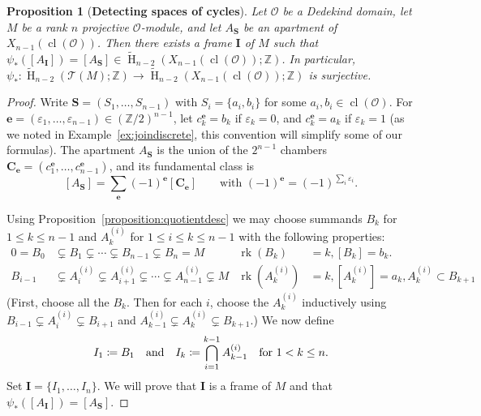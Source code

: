\documentclass[11 pt]{article}
\theoremstyle{plain}
\newtheorem{proposition}[theorem]{Proposition}
\theoremstyle{definition}
\numberwithin{equation}{section}
\newcommand\Z{\ensuremath{\mathbb{Z}}}
\DeclareMathOperator{\HH}{H}
\renewcommand{\epsilon}{\varepsilon}
\renewcommand{\O}{\mathcal{O}}
\DeclareMathOperator{\class}{cl}
\newcommand\Tits{\ensuremath{\mathcal{T}}}
\newcommand\II{\mathbf{I}}
\newcommand\bS{\mathbf{S}}
\newcommand\coloneq{\mathrel{\mathop:}\mkern-1.2mu=}
\newcommand\e{\mathbf{e}}
\newcommand\CC{\mathbf{C}}
\DeclareMathOperator{\Rank}{rk}
\begin{document}
\begin{proposition}[{\bf Detecting spaces of cycles}]
\label{prop:foldedapartment}
Let $\O$ be a Dedekind domain, let $M$ be a rank $n$ projective $\O$-module, and
let $A_{\bS}$ be an apartment of $X_{n-1}(\class(\O))$.  Then there exists a frame
$\II$ of $M$ such that
$\psi_{\ast}([A_\II])=[A_{\bS}] \in \widetilde{\HH}_{n-2}(X_{n-1}(\class(\O));\Z)$.
In particular, 
$\psi_\ast\colon \widetilde{\HH}_{n-2}(\Tits(M);\Z)\to \widetilde{\HH}_{n-2}(X_{n-1}(\class(\O));\Z)$ is surjective.
\end{proposition}
\begin{proof}
Write $\bS=(S_1,\ldots,S_{n-1})$ with 
$S_i=\{a_i,b_i\}$ for some $a_i,b_i\in\class(\O)$.  For $\e=(\epsilon_1,\ldots,\epsilon_{n-1})\in (\Z/2)^{n-1}$, 
let $c^\e_k=b_k$ if $\epsilon_k=0$, and $c^\e_k=a_k$ if $\epsilon_k=1$ (as
we noted in Example~\ref{ex:joindiscrete}, this convention will simplify some of our formulas).  The apartment 
$A_{\bS}$ is the union of the $2^{n-1}$ chambers $\CC_\e=(c^\e_1,\ldots,c^\e_{n-1})$, and its fundamental 
class is 
\[[A_{\bS}]=\sum_\e (-1)^{\e} [\CC_\e] \quad \quad \text{with $(-1)^{\e} = (-1)^{\sum_i \epsilon_i}$}.\]

Using Proposition~\ref{proposition:quotientdesc} we may choose summands $B_k$ for $1 \leq k \leq n-1$ and $A_k^{(i)}$ for $1 \leq i \leq k \leq n-1$ with the following properties:
\begin{align*}
0=B_0&\subsetneq B_1 \subsetneq \cdots \subsetneq B_{n-1} \subsetneq B_n=M& \Rank(B_k)&=k,[B_k]=b_k.\\
B_{i-1}& \subsetneq A_i^{(i)} \subsetneq A_{i+1}^{(i)} \subsetneq \cdots \subsetneq A_{n-1}^{(i)} \subsetneq M& \Rank(A_k^{(i)})& = k, [A_k^{(i)}] = a_k, A_k^{(i)} \subset B_{k+1}
\end{align*}
(First, choose all the $B_k$. Then for each $i$, choose the $A_k^{(i)}$ inductively using $B_{i-1}\subsetneq A_i^{(i)}\subsetneq B_{i+1}$ and  $A_{k-1}^{(i)}\subsetneq A_k^{(i)}\subsetneq B_{k+1}$.)
We now define
\[I_1\coloneq B_1 \quad \text{and} \quad I_k \coloneq \bigcap_{i=1}^{k-1} A_{k-1}^{(i)} \quad \text{for $1<k\leq n$}.\]
Set $\II = \{I_1,\ldots,I_n\}$.  We will prove that $\II$ is a frame of $M$ and that
$\psi_{\ast}([A_{\II}]) = [A_{\bS}]$.


\end{proof}
\end{document}
